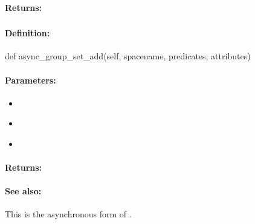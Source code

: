 \paragraph{Returns:}


\pagebreak
\subsubsection{}
\label{api:python:async_group_set_add}


\paragraph{Definition:}
\begin{pythoncode}
def async_group_set_add(self, spacename, predicates, attributes)
\end{pythoncode}

\paragraph{Parameters:}
\begin{itemize}[noitemsep]
\item {}\\

\item {}\\

\item {}\\

\end{itemize}

\paragraph{Returns:}


\paragraph{See also:}  This is the asynchronous form of .

\pagebreak
\subsubsection{}
\label{api:python:set_remove}



